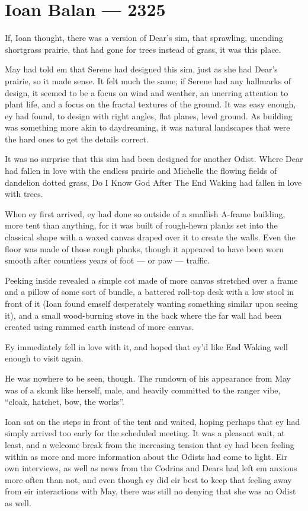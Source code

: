 \hypertarget{ioan-balan-2325}{%
\chapter{Ioan Balan — 2325}\label{ioan-balan-2325}}

If, Ioan thought, there was a version of Dear's sim, that sprawling, unending shortgrass prairie, that had gone for trees instead of grass, it was this place.

May had told em that Serene had designed this sim, just as she had Dear's prairie, so it made sense. It felt much the same; if Serene had any hallmarks of design, it seemed to be a focus on wind and weather, an unerring attention to plant life, and a focus on the fractal textures of the ground. It was easy enough, ey had found, to design with right angles, flat planes, level ground. As building was something more akin to daydreaming, it was natural landscapes that were the hard ones to get the details correct.

It was no surprise that this sim had been designed for another Odist. Where Dear had fallen in love with the endless prairie and Michelle the flowing fields of dandelion dotted grass, Do I Know God After The End Waking had fallen in love with trees.

When ey first arrived, ey had done so outside of a smallish A-frame building, more tent than anything, for it was built of rough-hewn planks set into the classical shape with a waxed canvas draped over it to create the walls. Even the floor was made of those rough planks, though it appeared to have been worn smooth after countless years of foot — or paw — traffic.

Peeking inside revealed a simple cot made of more canvas stretched over a frame and a pillow of some sort of bundle, a battered roll-top desk with a low stool in front of it (Ioan found emself desperately wanting something similar upon seeing it), and a small wood-burning stove in the back where the far wall had been created using rammed earth instead of more canvas.

Ey immediately fell in love with it, and hoped that ey'd like End Waking well enough to visit again.

He was nowhere to be seen, though. The rundown of his appearance from May was of a skunk like herself, male, and heavily committed to the ranger vibe, ``cloak, hatchet, bow, the works''.

Ioan sat on the steps in front of the tent and waited, hoping perhaps that ey had simply arrived too early for the scheduled meeting. It was a pleasant wait, at least, and a welcome break from the increasing tension that ey had been feeling within as more and more information about the Odists had come to light. Eir own interviews, as well as news from the Codrins and Dears had left em anxious more often than not, and even though ey did eir best to keep that feeling away from eir interactions with May, there was still no denying that she was an Odist as well.

